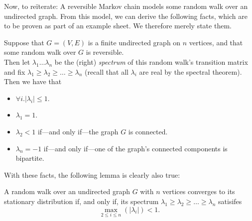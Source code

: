 	Now, to re\"iterate: A reversible Markov chain models some random walk over an undirected 
	graph. From this model, we can derive the following facts, which are to be proven as part 
	of an example sheet. We therefore merely state them.
	\begin{claim}
		Suppose that $G = (V,E)$ is a finite undirected graph on $n$ vertices, and that 
		some random walk over $G$ is reversible. \\
		Then let $\lambda_1 \hdots \lambda_n$ be the (right) \emph{spectrum} of this random 
		walk's
		transition matrix and fix $\lambda_1 \geq \lambda_2 \geq \hdots \geq \lambda_n$ 
		(recall that all $\lambda_i$ are real by the spectral theorem).
		Then we have that 
		\begin{itemize}
			\item $\forall i . |\lambda_i| \leq 1$.
			\item $\lambda_1 = 1$.
			\item $\lambda_2 < 1$ if---and only if---the graph $G$ is connected.
			\item $\lambda_n = -1$ if---and only if---one of the graph's connected 
			components is bipartite.
		\end{itemize}
	\end{claim}
	With these facts, the following lemma is clearly also true:
	\begin{lemma}
		A random walk over an undirected graph $G$ with $n$ vertices converges to its 
		stationary distribution if, and only if, its spectrum $\lambda_1\geq\lambda_2\geq
		\hdots\geq\lambda_n$ satisifes
		$$
			\max_{2\leq i\leq n}(|\lambda_i|) < 1 .
		$$
	\end{lemma}
